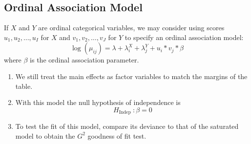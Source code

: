 \documentclass[11pt]{elegantbook}
\begin{document}
\subsection{Ordinal Association Model}
If $X$ and $Y$ are ordinal categorical variables, we may consider using scores $u_1, u_2, \ldots, u_I$ for $X$ and $v_1, v_2, \ldots, v_J$ for $Y$ to specify an ordinal association model:
$$
\log \left(\mu_{i j}\right)=\lambda+\lambda_i^X+\lambda_j^Y+u_i * v_j * \beta
$$
where $\beta$ is the ordinal association parameter.
\begin{enumerate}[$\bullet$]
    \item We still treat the main effects as factor variables to match the margins of the table.
    \item With this model the null hypothesis of independence is
    $$
    H_{\text {Indep }}: \beta=0
    $$
    \item To test the fit of this model, compare its deviance to that of the saturated model to obtain the $G^2$ goodness of fit test.
\end{enumerate}
\end{document}
